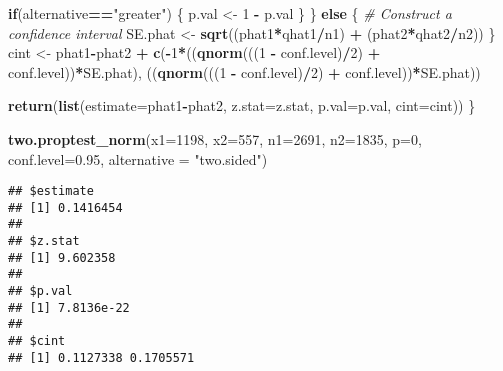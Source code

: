 \documentclass[]{article}
\newenvironment{Shaded}{\begin{snugshade}}{\end{snugshade}}
\newcommand{\KeywordTok}[1]{\textcolor[rgb]{0.13,0.29,0.53}{\textbf{#1}}}
\newcommand{\DataTypeTok}[1]{\textcolor[rgb]{0.13,0.29,0.53}{#1}}
\newcommand{\DecValTok}[1]{\textcolor[rgb]{0.00,0.00,0.81}{#1}}
\newcommand{\FloatTok}[1]{\textcolor[rgb]{0.00,0.00,0.81}{#1}}
\newcommand{\StringTok}[1]{\textcolor[rgb]{0.31,0.60,0.02}{#1}}
\newcommand{\CommentTok}[1]{\textcolor[rgb]{0.56,0.35,0.01}{\textit{#1}}}
\newcommand{\ControlFlowTok}[1]{\textcolor[rgb]{0.13,0.29,0.53}{\textbf{#1}}}
\newcommand{\OperatorTok}[1]{\textcolor[rgb]{0.81,0.36,0.00}{\textbf{#1}}}
\newcommand{\NormalTok}[1]{#1}
\begin{document}
\begin{Shaded}
\begin{Highlighting}[]
      \ControlFlowTok{if}\NormalTok{(alternative}\OperatorTok{==}\StringTok{"greater"}\NormalTok{) \{}
\NormalTok{        p.val <-}\StringTok{ }\DecValTok{1} \OperatorTok{-}\StringTok{ }\NormalTok{p.val}
\NormalTok{      \}}
\NormalTok{    \} }\ControlFlowTok{else}\NormalTok{ \{}
    \CommentTok{# Construct a confidence interval   }
\NormalTok{      SE.phat <-}\StringTok{ }\KeywordTok{sqrt}\NormalTok{((phat1}\OperatorTok{*}\NormalTok{qhat1}\OperatorTok{/}\NormalTok{n1) }\OperatorTok{+}\StringTok{ }\NormalTok{(phat2}\OperatorTok{*}\NormalTok{qhat2}\OperatorTok{/}\NormalTok{n2))}
\NormalTok{    \}}
\NormalTok{    cint <-}\StringTok{ }\NormalTok{phat1}\OperatorTok{-}\NormalTok{phat2 }\OperatorTok{+}\StringTok{ }\KeywordTok{c}\NormalTok{(}\OperatorTok{-}\DecValTok{1}\OperatorTok{*}\NormalTok{((}\KeywordTok{qnorm}\NormalTok{(((}\DecValTok{1} \OperatorTok{-}\StringTok{ }\NormalTok{conf.level)}\OperatorTok{/}\DecValTok{2}\NormalTok{) }\OperatorTok{+}\StringTok{ }\NormalTok{conf.level))}\OperatorTok{*}\NormalTok{SE.phat),}
\NormalTok{                        ((}\KeywordTok{qnorm}\NormalTok{(((}\DecValTok{1} \OperatorTok{-}\StringTok{ }\NormalTok{conf.level)}\OperatorTok{/}\DecValTok{2}\NormalTok{) }\OperatorTok{+}\StringTok{ }\NormalTok{conf.level))}\OperatorTok{*}\NormalTok{SE.phat))}
  
  \KeywordTok{return}\NormalTok{(}\KeywordTok{list}\NormalTok{(}\DataTypeTok{estimate=}\NormalTok{phat1}\OperatorTok{-}\NormalTok{phat2, }\DataTypeTok{z.stat=}\NormalTok{z.stat, }\DataTypeTok{p.val=}\NormalTok{p.val, }\DataTypeTok{cint=}\NormalTok{cint))}
\NormalTok{\}}
\end{Highlighting}
\end{Shaded}

\begin{Shaded}
\begin{Highlighting}[]
\KeywordTok{two.proptest_norm}\NormalTok{(}\DataTypeTok{x1=}\DecValTok{1198}\NormalTok{, }\DataTypeTok{x2=}\DecValTok{557}\NormalTok{, }\DataTypeTok{n1=}\DecValTok{2691}\NormalTok{, }\DataTypeTok{n2=}\DecValTok{1835}\NormalTok{, }\DataTypeTok{p=}\DecValTok{0}\NormalTok{, }\DataTypeTok{conf.level=}\FloatTok{0.95}\NormalTok{, }\DataTypeTok{alternative =} \StringTok{"two.sided"}\NormalTok{)}
\end{Highlighting}
\end{Shaded}

\begin{verbatim}
## $estimate
## [1] 0.1416454
## 
## $z.stat
## [1] 9.602358
## 
## $p.val
## [1] 7.8136e-22
## 
## $cint
## [1] 0.1127338 0.1705571
\end{verbatim}
\end{document}
